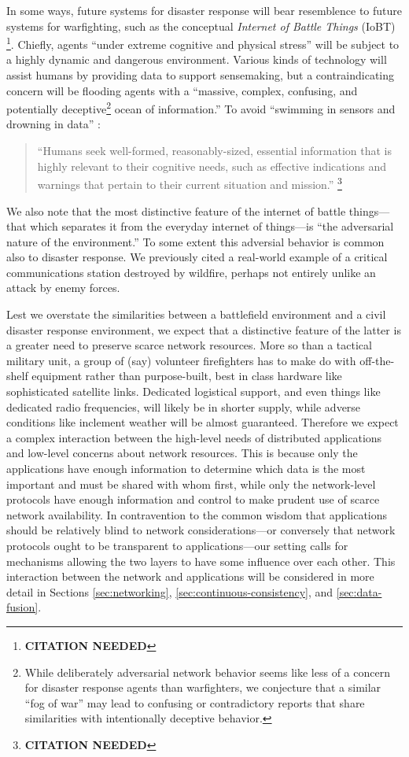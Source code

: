 \documentclass[]             %
{NASA}                       %
\theoremstyle{definition}
\newcommand{\citationneeded}{\footnote{\textbf{CITATION NEEDED}}}
\begin{document}
In some ways, future systems for disaster response will bear
resemblence to future systems for warfighting, such as the conceptual
\emph{Internet of Battle Things} (IoBT) \citationneeded. Chiefly,
agents ``under extreme cognitive and physical stress'' will be subject
to a highly dynamic and dangerous environment. Various kinds of
technology will assist humans by providing data to support
sensemaking, but a contraindicating concern will be flooding agents with a
``massive, complex, confusing, and potentially
deceptive\footnote{While deliberately adversarial network behavior
seems like less of a concern for disaster response agents than
warfighters, we conjecture that a similar ``fog of war'' may
lead to confusing or contradictory reports that share similarities
with intentionally deceptive behavior.} ocean of information.'' To
avoid ``swimming in sensors and drowning in data''
\cite{2010:magnuson}:
\begin{quote}
``Humans seek well-formed, reasonably-sized, essential information
  that is highly relevant to their cognitive needs, such as effective
  indications and warnings that pertain to their current situation and
  mission.'' \citationneeded
\end{quote}
We also note that the most distinctive feature of the internet of
battle things---that which separates it from the everyday internet of
things---is ``the adversarial nature of the environment.'' To some
extent this adversial behavior is common also to disaster response. We
previously cited a real-world example of a critical communications
station destroyed by wildfire, perhaps not entirely unlike an attack
by enemy forces.

Lest we overstate the similarities between a battlefield environment
and a civil disaster response environment, we expect that a
distinctive feature of the latter is a greater need to preserve scarce
network resources. More so than a tactical military unit, a group of
(say) volunteer firefighters has to make do with off-the-shelf
equipment rather than purpose-built, best in class hardware like
sophisticated satellite links. Dedicated logistical support, and even
things like dedicated radio frequencies, will likely be in shorter
supply, while adverse conditions like inclement weather will be almost
guaranteed. Therefore we expect a complex interaction between the
high-level needs of distributed applications and low-level concerns
about network resources. This is because only the applications have
enough information to determine which data is the most important and
must be shared with whom first, while only the network-level protocols
have enough information and control to make prudent use of scarce
network availability. In contravention to the common wisdom that
applications should be relatively blind to network considerations---or
conversely that network protocols ought to be transparent to
applications---our setting calls for mechanisms allowing the two
layers to have some influence over each other. This interaction
between the network and applications will be considered in more detail
in Sections \ref{sec:networking}, \ref{sec:continuous-consistency},
and \ref{sec:data-fusion}.
\end{document}
